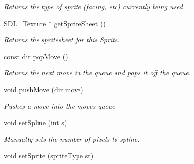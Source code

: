 \begin{DoxyCompactItemize}
\begin{DoxyCompactList}\small\item\em Returns the type of sprite (facing, etc) currently being used. \end{DoxyCompactList}\item 
S\+D\+L\+\_\+\+Texture $\ast$ \hyperlink{class_sprite_abec247d2cd9396834344c3cfe81eddc1}{get\+Sprite\+Sheet} ()\hypertarget{class_sprite_abec247d2cd9396834344c3cfe81eddc1}{}\label{class_sprite_abec247d2cd9396834344c3cfe81eddc1}

\begin{DoxyCompactList}\small\item\em Returns the spritesheet for this \hyperlink{class_sprite}{Sprite}. \end{DoxyCompactList}\item 
const dir \hyperlink{class_sprite_a8dde7dfa8e056ce518aed58e4800b890}{pop\+Move} ()\hypertarget{class_sprite_a8dde7dfa8e056ce518aed58e4800b890}{}\label{class_sprite_a8dde7dfa8e056ce518aed58e4800b890}

\begin{DoxyCompactList}\small\item\em Returns the next move in the queue and pops it off the queue. \end{DoxyCompactList}\item 
void \hyperlink{class_sprite_acf3e37d27ca2bed1901e182144a64400}{push\+Move} (dir move)\hypertarget{class_sprite_acf3e37d27ca2bed1901e182144a64400}{}\label{class_sprite_acf3e37d27ca2bed1901e182144a64400}

\begin{DoxyCompactList}\small\item\em Pushes a move into the moves queue. \end{DoxyCompactList}\item 
void \hyperlink{class_sprite_a1ce4def2f83442fd086e38568f93c6cd}{set\+Spline} (int s)\hypertarget{class_sprite_a1ce4def2f83442fd086e38568f93c6cd}{}\label{class_sprite_a1ce4def2f83442fd086e38568f93c6cd}

\begin{DoxyCompactList}\small\item\em Manually sets the number of pixels to spline. \end{DoxyCompactList}\item 
void \hyperlink{class_sprite_aa9d0dd6123988d79c94a18f3e404d8d7}{set\+Sprite} (sprite\+Type st)\hypertarget{class_sprite_aa9d0dd6123988d79c94a18f3e404d8d7}{}\label{class_sprite_aa9d0dd6123988d79c94a18f3e404d8d7}


\end{DoxyCompactItemize}
